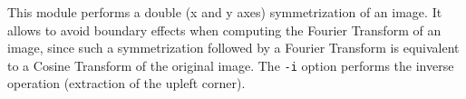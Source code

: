 This module performs a double (x and y axes) symmetrization of an image.
It allows to avoid boundary effects 
when computing the Fourier Transform of an image, since such
a symmetrization followed by a Fourier Transform is equivalent to 
a Cosine Transform of the original image.
The \verb+-i+ option performs the inverse operation (extraction of
the upleft corner). 

